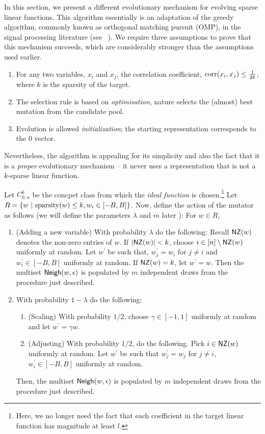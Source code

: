 In this section, we present a different evolutionary mechanism for evolving
sparse linear functions. This algorithm essentially is an adaptation of the
greedy algorithm, commonly known as orthogonal matching pursuit (OMP), in the
signal processing literature (see ~\cite{Donoho:2006-recovery,
Tropp:2004-greed}). We require three assumptions to prove that this mechanism
succeeds, which are considerably stronger than the assumptions used earlier.
\begin{enumerate}
%
\item For any two variables, $x_i$ and $x_j$, the correlation coefficient,
$\mathrm{corr}(x_i, x_j) \leq \frac{1}{2k}$, where $k$ is the sparsity of the target.
%
\item The selection rule is based on \emph{optimisation}, \ie nature selects the
(almost) best mutation from the candidate pool. 
%
\item Evolution is allowed \emph{initialization}; the starting representation
corresponds to the $0$ vector.
%
\end{enumerate}

Nevertheless, the algorithm is appealing for its simplicity and also the fact
that it is a \emph{proper} evolutionary mechanism -- it never uses a
representation that is not a $k$-sparse linear function. 

Let $C^k_{0, u}$ be the concpet class from which the \emph{ideal function} is
chosen.\footnote{Here, we no longer need the fact that each coefficient in the
target linear function has magnitude at least $l$.} Let $R = \{w ~|~
\mathrm{sparsity}(w) \leq k, w_i \in [-B, B] \}$. Now, define the action of the mutator
as follows (we will define the parameters $\lambda$ and $m$ later ): For $w \in R$, 
\begin{enumerate}
\item (Adding a new variable) With probability $\lambda$ do the following:
Recall $\mathsf{NZ}(w)$ denotes the non-zero entries of $w$. If $|\mathsf{NZ}(w)| < k$, choose
$i \in [n] \setminus \mathsf{NZ}(w)$ uniformly at random. Let $w^\prime$ be such that,
$w^\prime_j = w_i$ for $j \neq i$ and $w^\prime_i \in [-B, B]$ uniformly at
random. If $\mathsf{NZ}(w)= k$, let $w^\prime = w$. Then the multiset $\mathsf{Neigh}(w,
\epsilon)$ is populated by $m$ independent draws from the procedure just
described.
%
\item With probability $1 - \lambda$ do the following:
%
\begin{enumerate}
\item (Scaling) With probability $1/2$, choose $\gamma \in [-1, 1]$ uniformly at
random and let $w^\prime = \gamma w$.
%
\item (Adjusting) With probability $1/2$, do the following.  Pick $i \in \mathsf{NZ}(w)$
uniformly at random.  Let $w^\prime$ be such that $w^\prime_j = w_j$ for $j \neq
i$, $w^\prime_i \in [-B, B]$ uniformly at random.
\end{enumerate}
Then, the multiset $\mathsf{Neigh}(w, \epsilon)$ is populated by $m$ independent draws
from the procedure just described.
\end{enumerate}

